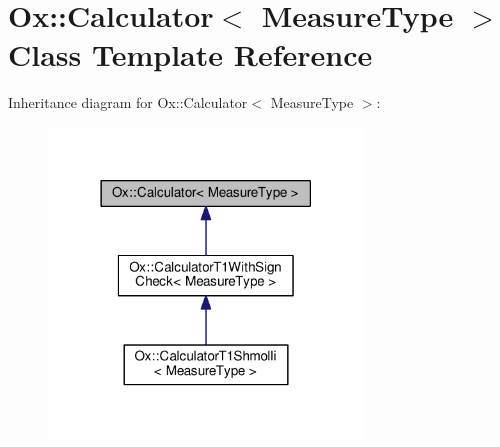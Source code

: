 \hypertarget{class_ox_1_1_calculator}{}\section{Ox\+:\+:Calculator$<$ Measure\+Type $>$ Class Template Reference}
\label{class_ox_1_1_calculator}


Inheritance diagram for Ox\+:\+:Calculator$<$ Measure\+Type $>$\+:
\nopagebreak
\begin{figure}[H]
\begin{center}
\leavevmode
\includegraphics[width=237pt]{class_ox_1_1_calculator__inherit__graph}
\end{center}
\end{figure}
